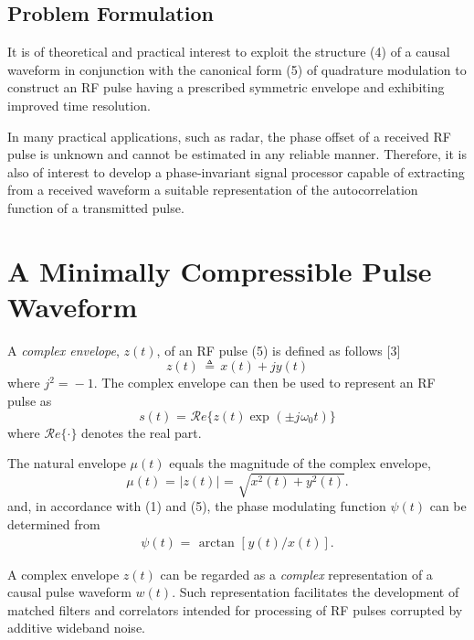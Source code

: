 \documentclass[journal]{IEEEtran}
\begin{document}
\subsection{Problem Formulation}
It is of theoretical and practical interest to exploit the structure (4) of a causal waveform in conjunction with the canonical form (5) of quadrature modulation to construct an RF pulse having a prescribed symmetric envelope and exhibiting improved time resolution. 

In many practical applications, such as radar, the phase offset of a received RF pulse is unknown and cannot be estimated in any reliable manner. Therefore, it is also of interest to develop a phase-invariant signal processor capable of extracting from a received waveform a suitable representation of the autocorrelation function of a transmitted pulse. 


\section{A Minimally Compressible Pulse Waveform}
A {\emph {complex envelope}}, $z(t)$, of an RF pulse (5) is defined as follows [3]
\begin{equation}
	z(t)\, \triangleq \,x(t) + j y(t) 
\end{equation}
where $j^2\!=\!-1$.
The complex envelope can then be used to represent an RF pulse as
\begin{equation}
	s(t)\mspace{1mu} = \mspace{1mu}\mathcal{R}e\{z(t) \exp\mspace{1mu}(\pm j\mspace{1mu}\omega_0 t)\}
\end{equation}
where $\mathcal{R}e\{\cdot\}$ denotes the real part.

The natural envelope $\mu(t)$ equals the magnitude of the complex envelope,
\begin{equation}
	\mu(t) \mspace{1mu} = \mspace{1mu} |z(t)| \mspace{1mu} = \mspace{1mu} \sqrt{x^2(t) + y^2(t)} .
\end{equation}
and, in accordance with (1) and (5), the phase modulating function $\psi(t)$ can be determined from
\begin{eqnarray}
	\psi(t) \mspace{1mu} = \mspace{2mu} \arctan\mspace{1mu}[\mspace{1mu}{y(t)/x(t)}] .
\end{eqnarray}

A complex envelope $z(t)$ can be regarded as a {\emph {complex}} representation of a causal pulse waveform $w(t)$. Such representation facilitates the development of matched filters and correlators intended for processing of RF pulses corrupted by additive wideband noise.
\end{document}
